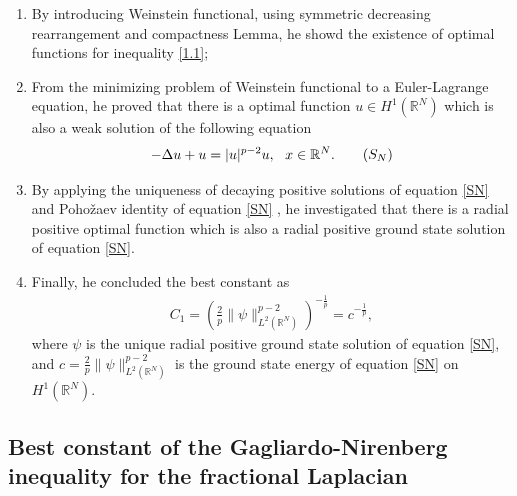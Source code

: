 \documentclass[12pt,a4paper,reqno]{amsart}
\numberwithin{equation}{section}
\begin{document}
\begin{enumerate}
\item [Step 1.]
By introducing Weinstein functional, using symmetric decreasing rearrangement and compactness Lemma, he showd the existence of optimal functions for inequality \eqref{1.1};


\item [Step 2.]
From the minimizing problem of Weinstein functional to a Euler-Lagrange equation, he proved that there is a optimal function $u\in H^{1}(\mathbb{R}^{N})$ which is also a weak solution of the following equation
\begin{equation}\label{SN}
\begin{aligned}
-\Delta u+u =|u|^{p-2}u, \ \ x\in\mathbb{R}^{N}.
\end{aligned}
\tag{$S_{N}$}
\end{equation}

\item [Step 3.]
By applying the uniqueness of decaying positive solutions of equation \eqref{SN} \cite{Serrin-M.X.Tang2000IUMJ} and Poho\v{z}aev identity of equation \eqref{SN} \cite{Berestycki-Lions1983ARMA}, he investigated that there is a radial positive optimal function which is also a radial positive ground state solution of equation \eqref{SN}.

\item [Step 4.]
Finally,
he concluded the best constant as
\begin{equation*}
\begin{aligned}
C_{1}=
\left(\frac{2}{p}\|\psi\|_{L^{2}(\mathbb{R}^{N})}^{p-2}\right)^{-\frac{1}{p}}
=c^{-\frac{1}{p}},
\end{aligned}
\end{equation*}
where $\psi$ is the unique radial positive ground state solution of equation \eqref{SN}, and $c=\frac{2}{p}\|\psi\|_{L^{2}(\mathbb{R}^{N})}^{p-2}$ is the ground state energy of equation \eqref{SN} on $H^{1}(\mathbb{R}^{N})$.
\end{enumerate}


\subsection{Best constant of the Gagliardo-Nirenberg inequality for the fractional Laplacian}
\end{document}
